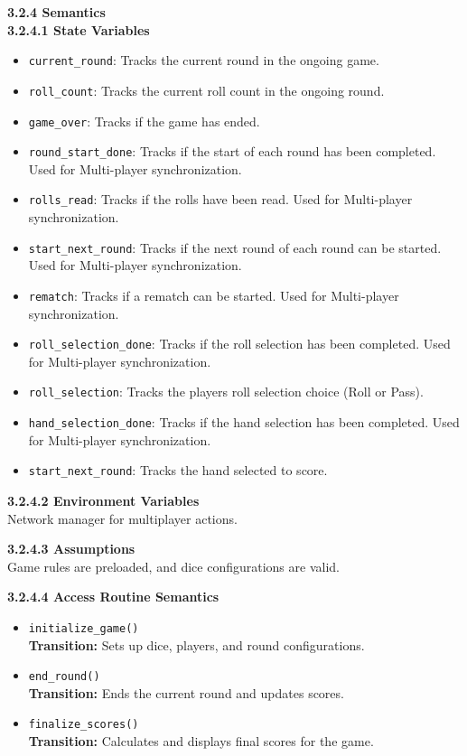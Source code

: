 \documentclass[12pt, titlepage]{article}
\begin{document}
\textbf{3.2.4 Semantics}\\
\textbf{3.2.4.1 State Variables}\\
\begin{itemize}
    \item \texttt{current\_round}: Tracks the current round in the ongoing game.
    \item \texttt{roll\_count}: Tracks the current roll count in the ongoing round.
    \item \texttt{game\_over}: Tracks if the game has ended.
    \item \texttt{round\_start\_done}: Tracks if the start of each round has been completed. Used for Multi-player synchronization.
    \item \texttt{rolls\_read}: Tracks if the rolls have been read. Used for Multi-player synchronization.
    \item \texttt{start\_next\_round}: Tracks if the next round of each round can be started. Used for Multi-player synchronization.
    \item \texttt{rematch}: Tracks if a rematch can be started. Used for Multi-player synchronization.
    \item \texttt{roll\_selection\_done}: Tracks if the roll selection has been completed. Used for Multi-player synchronization.
    \item \texttt{roll\_selection}: Tracks the players roll selection choice (Roll or Pass).
    \item \texttt{hand\_selection\_done}: Tracks if the hand selection has been completed. Used for Multi-player synchronization.
    \item \texttt{start\_next\_round}: Tracks the hand selected to score.
\end{itemize}

\textbf{3.2.4.2 Environment Variables}\\
Network manager for multiplayer actions.

\textbf{3.2.4.3 Assumptions}\\
Game rules are preloaded, and dice configurations are valid.

\textbf{3.2.4.4 Access Routine Semantics}
\begin{itemize}
    \item \texttt{initialize\_game()}\\
    \textbf{Transition:} Sets up dice, players, and round configurations.

    \item \texttt{end\_round()}\\
    \textbf{Transition:} Ends the current round and updates scores.

    \item \texttt{finalize\_scores()}\\
    \textbf{Transition:} Calculates and displays final scores for the game.
\end{itemize}
\end{document}
